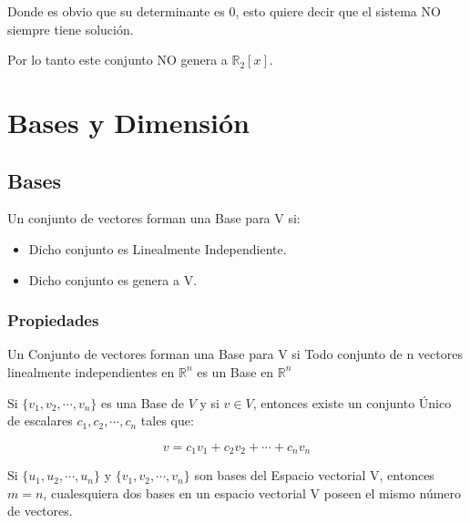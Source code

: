 \documentclass[12pt]{report}                                %
\begin{document}
            Donde es obvio que su determinante es 0, esto quiere decir que el
            sistema NO siempre tiene solución.

            Por lo tanto este conjunto NO genera a $\mathbb{R}_2 [x]$.


    \clearpage
    \section{Bases y Dimensión}

        \subsection{Bases}
        Un conjunto de vectores forman una Base para V si:
        \begin{itemize}
            \item Dicho conjunto es Linealmente Independiente.

            \item Dicho conjunto es genera a V.
        \end{itemize}

        \subsubsection{Propiedades}
        Un Conjunto de vectores forman una Base para V si Todo conjunto de n vectores
        linealmente independientes en $\mathbb{R}^n$ es un Base en $\mathbb{R}^n$

        Si $\{ v_1, v_2,\cdots, v_n\}$ es una Base de $V$ y si $v \in V$, entonces
        existe un conjunto Único de escalares $c_1, c_2, \cdots, c_n$ tales que:

        \begin{equation}
            v = c_1v_1 + c_2v_2 + \cdots + c_nv_n
        \end{equation}

        Si $\{u_1, u_2, \cdots, u_n\}$ y $\{v_1, v_2, \cdots, v_n\}$ son bases del
        Espacio vectorial V, entonces $m = n$, cualesquiera dos bases en un espacio
        vectorial V poseen el mismo número de vectores.

\end{document}
